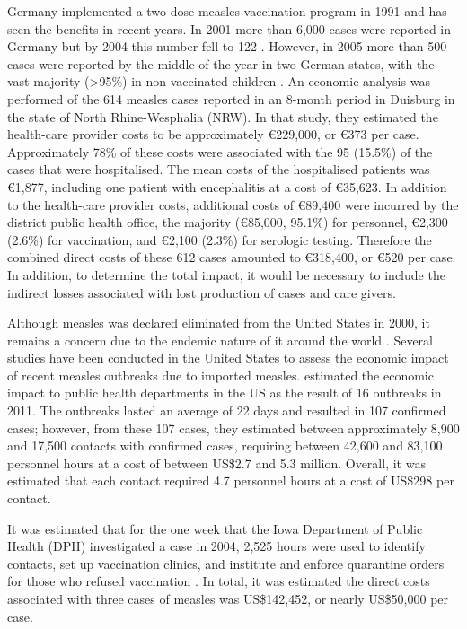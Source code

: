 \documentclass{article}
\begin{document}
\begin{itemize}
Germany implemented a two-dose measles vaccination program in 1991 and has seen the benefits in recent years. In 2001 more than 6,000 cases were reported in Germany but by 2004 this number fell to 122 \citep{wichmann9}. However, in 2005 more than 500 cases were reported by the middle of the year in two German states, with the vast majority (>95\%) in non-vaccinated children \citep{siedler6}. An economic analysis was performed of the 614 measles cases reported in an 8-month period in Duisburg in the state of North Rhine-Wesphalia (NRW). In that study, they estimated the health-care provider costs to be approximately \euro 229,000, or \euro 373 per case. Approximately 78\% of these costs were associated with the 95 (15.5\%) of the cases that were hospitalised. The mean costs of the hospitalised patients was  \euro 1,877, including one patient with encephalitis at a cost of \euro 35,623. In addition to the health-care provider costs, additional costs of \euro 89,400 were incurred by the district public health office, the majority (\euro 85,000, 95.1\%) for personnel, \euro 2,300 (2.6\%) for vaccination, and \euro 2,100 (2.3\%) for serologic testing. Therefore the combined direct costs of these 612 cases amounted to \euro 318,400, or \euro 520 per case. In addition, to determine the total impact, it would be necessary to include the indirect losses associated with lost production of cases and care givers.

Although measles was declared eliminated from the United States in 2000, it remains a concern due to the endemic nature of it around the world \citep{parker6}. Several studies have been conducted in the United States to assess the economic impact of recent measles outbreaks due to imported measles.  \citep{ortegasanchez14} estimated the economic impact to public health departments in the US as the result of 16 outbreaks in 2011. The outbreaks lasted an average of 22 days and resulted in 107 confirmed cases; however, from these 107 cases, they estimated between approximately 8,900 and 17,500 contacts with confirmed cases, requiring between 42,600 and 83,100 personnel hours at a cost of between US\$2.7 and 5.3 million. Overall, it was estimated that each contact required 4.7 personnel hours at a cost of US\$298 per contact.

It was estimated that for the one week that the Iowa Department of Public Health (DPH) investigated a case in 2004, 2,525 hours were used to identify contacts, set up vaccination clinics, and institute and enforce quarantine orders for those who refused vaccination \citep{dayan5}. In total, it was estimated the direct costs associated with three cases of measles was US\$142,452, or nearly US\$50,000 per case.


\end{itemize}
\end{document}
